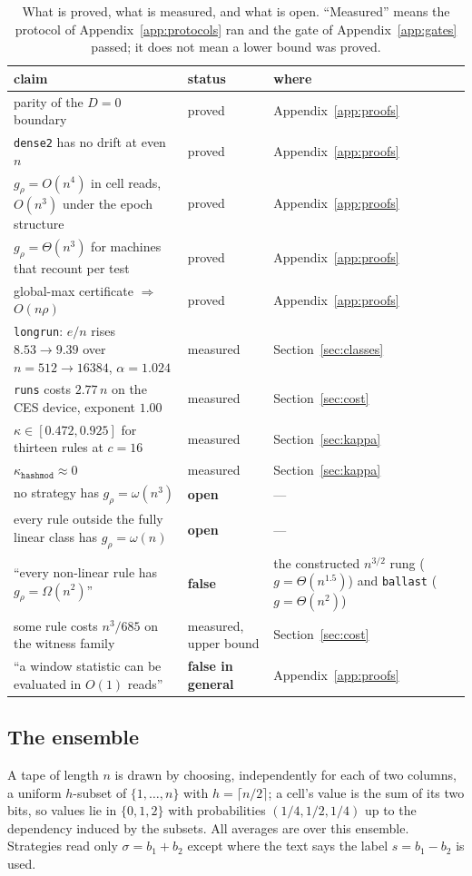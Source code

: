 \begin{table}[h]
\centering
\small
\begin{tabular}{@{}p{}p{}p{}@{}}
\toprule
claim & status & where \\
\midrule
parity of the $D=0$ boundary & proved & Appendix~\ref{app:proofs} \\
\texttt{dense2} has no drift at even $n$ & proved & Appendix~\ref{app:proofs} \\
$g_\rho=O(n^4)$ in cell reads, $O(n^3)$ under the epoch structure & proved & Appendix~\ref{app:proofs} \\
$g_\rho=\Theta(n^3)$ for machines that recount per test & proved & Appendix~\ref{app:proofs} \\
global-max certificate $\Rightarrow$ $O(n\rho)$ & proved & Appendix~\ref{app:proofs} \\
\texttt{longrun}: $e/n$ rises $8.53\to9.39$ over $n=512\to16384$, $\alpha=1.024$ & measured & Section~\ref{sec:classes} \\
\texttt{runs} costs $2.77\,n$ on the CES device, exponent $1.00$ & measured & Section~\ref{sec:cost} \\
$\kappa\in[0.472,0.925]$ for thirteen rules at $c=16$ & measured & Section~\ref{sec:kappa} \\
$\kappa_{\texttt{hashmod}}\approx0$ & measured & Section~\ref{sec:kappa} \\
\midrule
no strategy has $g_\rho=\omega(n^3)$ & \textbf{open} & --- \\
every rule outside the fully linear class has $g_\rho=\omega(n)$ & \textbf{open} & --- \\
\midrule
``every non-linear rule has $g_\rho=\Omega(n^2)$'' & \textbf{false} & the constructed
$n^{3/2}$ rung ($g=\Theta(n^{1.5})$) and \texttt{ballast} ($g=\Theta(n^2)$) \\
some rule costs $n^{3}/685$ on the witness family & measured, upper bound & Section~\ref{sec:cost} \\
``a window statistic can be evaluated in $O(1)$ reads'' & \textbf{false in general} & Appendix~\ref{app:proofs} \\
\bottomrule
\end{tabular}
\caption{What is proved, what is measured, and what is open. ``Measured''
means the protocol of Appendix~\ref{app:protocols} ran and the gate of
Appendix~\ref{app:gates} passed; it does not mean a lower bound was
proved.}
\end{table}

\subsection{The ensemble}
\label{app:ensemble}

A tape of length $n$ is drawn by choosing, independently for each of two
columns, a uniform $h$-subset of $\{1,\dots,n\}$ with $h=\lceil n/2\rceil$;
a cell's value is the sum of its two bits, so values lie in $\{0,1,2\}$
with probabilities $(1/4,1/2,1/4)$ up to the dependency induced by the
subsets. All averages are over this ensemble. Strategies read only
$\sigma=b_1+b_2$ except where the text says the label $s=b_1-b_2$ is used.
